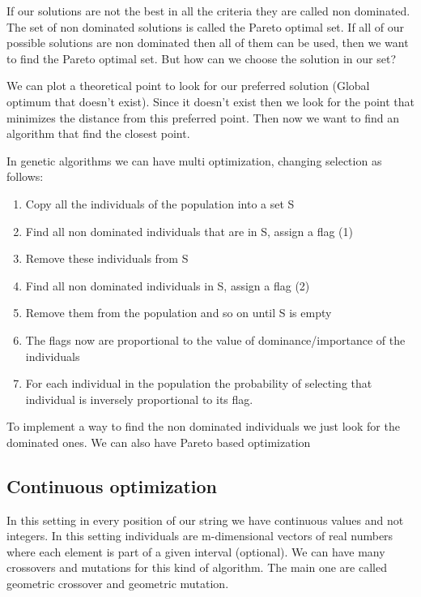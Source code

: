 \vspace{10pt}

If our solutions are not the best in all the criteria they are called non dominated. The set of non dominated solutions is called the Pareto optimal set. If all of our possible solutions are non dominated then all of them can be used, then we want to find the Pareto optimal set. But how can we choose the solution in our set? 

\vspace{10pt}

We can plot a theoretical point to look for our preferred solution (Global optimum that doesn't exist). Since it doesn't exist then we look for the point that minimizes the distance from this preferred point. Then now we want to find an algorithm that find the closest point. 



\vspace{10pt}

In genetic algorithms we can have multi optimization, changing selection as follows:

\begin{enumerate}
    \item Copy all the individuals of the population into a set S
    \item Find all non dominated individuals that are in S, assign a flag (1)
    \item Remove these individuals from S
    \item Find all non dominated individuals in S, assign a flag (2)
    \item Remove them from the population and so on until S is empty
    \item The flags now are proportional to the value of dominance/importance of the individuals
    \item For each individual in the population the probability of selecting that individual is inversely proportional to its flag. 
\end{enumerate}

To implement a way to find the non dominated individuals we just look for the dominated ones.
We can also have Pareto based optimization


\subsection{Continuous optimization}

In this setting in every position of our string we have continuous values and not integers. In this setting individuals are m-dimensional vectors of real numbers where each element is part of a given interval (optional). We can have many crossovers and mutations for this kind of algorithm. The main one are called geometric crossover and geometric mutation. 

